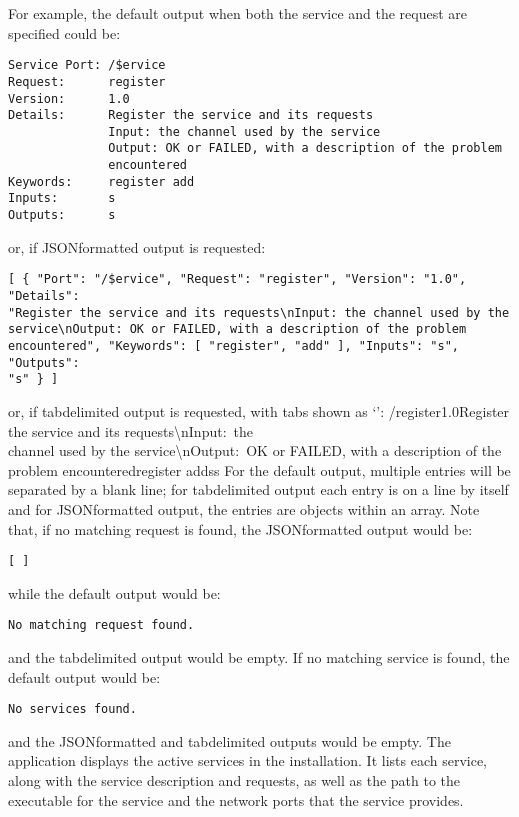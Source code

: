For example, the default output when both the service and the request are specified could
be:
\outputBegin
\begin{verbatim}
Service Port: /$ervice
Request:      register
Version:      1.0
Details:      Register the service and its requests
              Input: the channel used by the service
              Output: OK or FAILED, with a description of the problem
              encountered
Keywords:     register add
Inputs:       s
Outputs:      s
\end{verbatim}
\outputEnd{}
or, if JSON\longDash{}formatted output is requested:
\outputBegin
\begin{verbatim}
[ { "Port": "/$ervice", "Request": "register", "Version": "1.0", "Details":
"Register the service and its requests\nInput: the channel used by the
service\nOutput: OK or FAILED, with a description of the problem
encountered", "Keywords": [ "register", "add" ], "Inputs": "s", "Outputs":
"s" } ]
\end{verbatim}
\outputEnd
or, if tab\longDash{}delimited output is requested, with tabs shown as `\tabSymbol':
\outputBegin{}
/\dollarService\pseudotab{}register\pseudotab{}1.0\pseudotab{}Register the service and its
requests\textbackslash{}nInput:\ the\\
channel used by the service\textbackslash{}nOutput:\ OK or FAILED, with a description of
the\\
problem encountered\pseudotab{}register add\pseudotab{}s\pseudotab{}s
\outputEnd{}
For the default output, multiple entries will be separated by a blank line; for
tab\longDash{}delimited output each entry is on a line by itself and for
JSON\longDash{}formatted output, the entries are objects within an array.
Note that, if no matching request is found, the JSON\longDash{}formatted output would be:
\outputBegin
\begin{verbatim}
[ ]
\end{verbatim}
\outputEnd{}
while the default output would be:
\outputBegin
\begin{verbatim}
No matching request found.
\end{verbatim}
\outputEnd{}
and the tab\longDash{}delimited output would be empty.
If no matching service is found, the default output would be:
\outputBegin
\begin{verbatim}
No services found.
\end{verbatim}
\outputEnd{}
and the JSON\longDash{}formatted and tab\longDash{}delimited outputs would be empty.
\condPage
{}
The application  displays the active services in the
\mplusm{} installation.
It lists each service, along with the service description and requests, as well as the
path to the executable for the service and the \yarp{} network ports that the service
provides.\\

